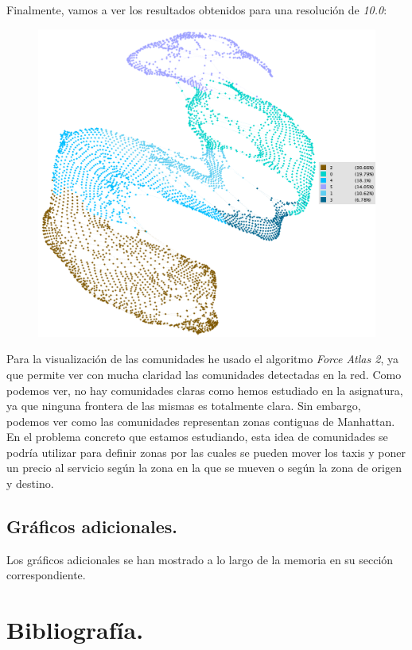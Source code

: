 \documentclass[11pt]{article}
\begin{document}
Finalmente, vamos a ver los resultados obtenidos para una resolución de \textit{10.0}:

\begin{figure}[H]
	\centering
	\includegraphics[width=\linewidth]{images/2_3_10_lovaina.png}
\end{figure}

Para la visualización de las comunidades he usado el algoritmo \textit{Force Atlas 2}, ya que permite ver con mucha claridad las comunidades detectadas en la red. Como podemos ver, no hay comunidades claras como hemos estudiado en la asignatura, ya que ninguna frontera de las mismas es totalmente clara. Sin embargo, podemos ver como las comunidades representan zonas contiguas de Manhattan. En el problema concreto que estamos estudiando, esta idea de comunidades se podría utilizar para definir zonas por las cuales se pueden mover los taxis y poner un precio al servicio según la zona en la que se mueven o según la zona de origen y destino.

\subsection{Gráficos adicionales.}

Los gráficos adicionales se han mostrado a lo largo de la memoria en su sección correspondiente.

\section{Bibliografía.}
\end{document}
